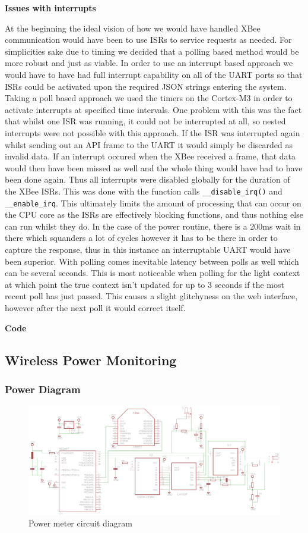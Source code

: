 \documentclass[10.5pt,a4paper,twoside]{report}   %
\begin{document}
\textbf{Issues with interrupts}

At the beginning the ideal vision of how we would have handled XBee communication would have been to use ISRs to service requests as needed. For simplicities sake due to timing we decided that a polling based method would be more robust and just as viable. In order to use an interrupt based approach we would have to have had full interrupt capability on all of the UART ports so that ISRs could be activated upon the required JSON strings entering the system. Taking a poll based approach we used the timers on the Cortex-M3 in order to activate interrupts at specified time intervals. One problem with this was the fact that whilst one ISR was running, it could not be interrupted at all, so nested interrupts were not possible with this approach. If the ISR was interrupted again whilst sending out an API frame to the UART it would simply be discarded as invalid data. If an interrupt occured when the XBee received a frame, that data would then have been missed as well and the whole thing would have had to have been done again. Thus all interrupts were disabled globally for the duration of the XBee ISRs. This was done with the function calls \verb+__disable_irq()+ and \verb+__enable_irq+. This ultimately limits the amount of processing that can occur on the CPU core as the ISRs are effectively blocking functions, and thus nothing else can run whilst they do. In the case of the power routine, there is a 200ms wait in there which squanders a lot of cycles however it has to be there in order to capture the response, thus in this instance an interruptable UART would have been superior. With polling comes inevitable latency between polls as well which can be several seconds. This is most noticeable when polling for the light context at which point the true context isn't updated for up to 3 seconds if the most recent poll has just passed. This causes a slight glitchyness on the web interface, however after the next poll it would correct itself.

\textbf{Code}


\subsection{Wireless Power Monitoring}
\subsubsection{Power Diagram}
\begin{figure}[h!]
\centering
\includegraphics[width=1.5\textwidth, angle=90]{images/power_diagram.png}
\caption{Power meter circuit diagram}
\end{figure}
\end{document}
